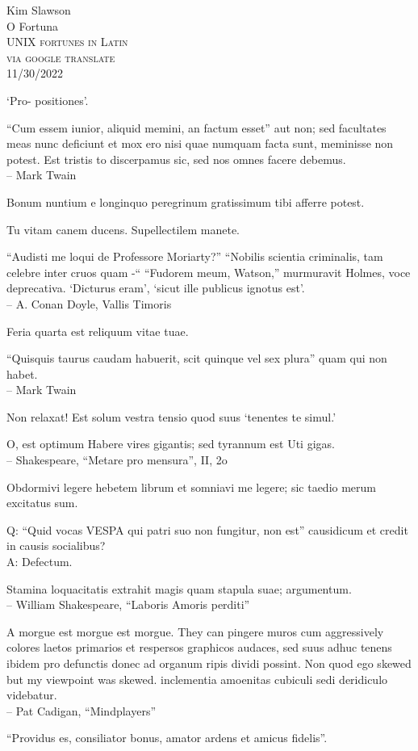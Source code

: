 \documentclass[titlepage,12pt]{memoir}
\newcommand*{\titleAM}{\begingroup
\centering
\vspace*{10pt}
{\large Kim Slawson}\\[\baselineskip]
{\Huge O Fortuna}\\[\baselineskip]
{\scshape UNIX fortunes in Latin}\\
{\scshape via google translate}\\[\baselineskip]
{\small\scshape 11/30/2022}\par
\vfill\null
\endgroup}
\begin{document}
\pagestyle{empty}
\titleAM
\clearpage


‘Pro- positiones’.

“Cum essem iunior, aliquid memini, an factum esset”
aut non; sed facultates meas nunc deficiunt et mox ero
nisi quae numquam facta sunt, meminisse non potest. Est tristis to
discerpamus sic, sed nos omnes facere debemus.
\\-- Mark Twain

Bonum nuntium e longinquo peregrinum gratissimum tibi afferre potest.

Tu vitam canem ducens. Supellectilem manete.

 “Audisti me loqui de Professore Moriarty?”
“Nobilis scientia criminalis, tam celebre inter cruos quam -“
“Fudorem meum, Watson,” murmuravit Holmes, voce deprecativa.
‘Dicturus eram’, ‘sicut ille publicus ignotus est’.
\\-- A. Conan Doyle, Vallis Timoris

Feria quarta est reliquum vitae tuae.

“Quisquis taurus caudam habuerit, scit quinque vel sex plura”
quam qui non habet.
\\-- Mark Twain

Non relaxat! Est solum vestra tensio quod suus ‘tenentes te simul.’

O, est optimum
Habere vires gigantis; sed tyrannum est
Uti gigas.
\\-- Shakespeare, “Metare pro mensura”, II, 2o

Obdormivi legere hebetem librum et somniavi me legere;
sic taedio merum excitatus sum.

Q: “Quid vocas VESPA qui patri suo non fungitur, non est”
causidicum et credit in causis socialibus?\\
A: Defectum.

Stamina loquacitatis extrahit magis quam stapula suae;
argumentum.
\\-- William Shakespeare, “Laboris Amoris perditi”

A morgue est morgue est morgue. They can pingere muros cum aggressively
colores laetos primarios et respersos graphicos audaces, sed suus adhuc tenens
ibidem pro defunctis donec ad organum ripis dividi possint. Non quod ego
skewed but my viewpoint was skewed. inclementia
amoenitas cubiculi sedi deridiculo videbatur.
\\-- Pat Cadigan, “Mindplayers”

“Providus es, consiliator bonus, amator ardens et amicus fidelis”.
\end{document}
